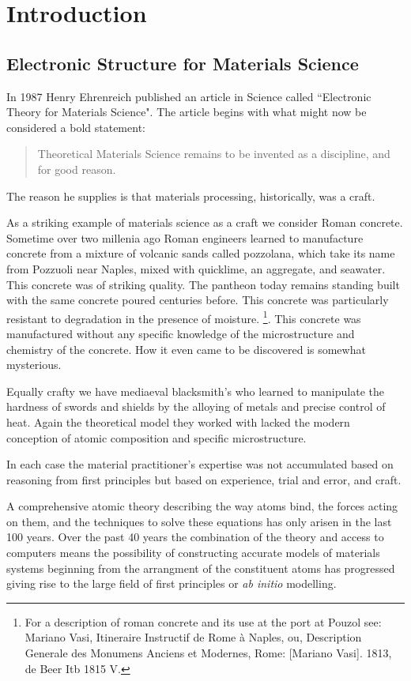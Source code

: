 \chapter{Introduction}
\section{Electronic Structure for Materials Science}
In 1987 Henry Ehrenreich published an article in Science called
``Electronic Theory for Materials Science". The article begins
with what might now be considered a bold statement:

\begin{quote}
Theoretical Materials Science remains to be invented as a discipline, and for good reason.
\end{quote}

The reason he supplies is that materials processing, historically, was a craft. 

As a striking example of materials science as a craft we consider Roman concrete.
Sometime over two millenia ago Roman engineers learned to manufacture concrete 
from a mixture of volcanic sands called pozzolana,
which take its name from Pozzuoli near Naples, mixed with quicklime, an aggregate, and seawater.
This concrete was of striking quality. The pantheon today remains standing 
built with the same concrete poured centuries before.
This concrete was particularly resistant to degradation in the presence of moisture.
\footnote{For a description of roman concrete and its use at the port at Pouzol see: Mariano Vasi, 
Itineraire Instructif de Rome à Naples, ou, Description Generale des Monumens Anciens et Modernes, 
Rome: [Mariano Vasi]. 1813, de Beer Itb 1815 V.}. 
This concrete was manufactured without any specific knowledge of the microstructure and 
chemistry of the concrete. How it even came to be discovered is somewhat mysterious.

Equally crafty we have mediaeval blacksmith's who learned to manipulate the 
hardness of swords and shields by the alloying of metals and precise control of heat. 
Again the theoretical model they worked with lacked the modern conception of 
atomic composition and specific microstructure.

In each case the material practitioner's expertise was not accumulated based on reasoning 
from first principles but based on experience, trial and error, and craft.

A comprehensive atomic theory describing the way atoms bind, the forces acting on them, 
and the techniques to solve these equations has only arisen in the last 100 years. 
Over the past 40 years the combination of the theory and access to computers 
means the possibility of constructing accurate models of materials 
systems beginning from the arrangment of the constituent atoms has
progressed giving rise to the large field of first principles or {\it ab initio} modelling.

